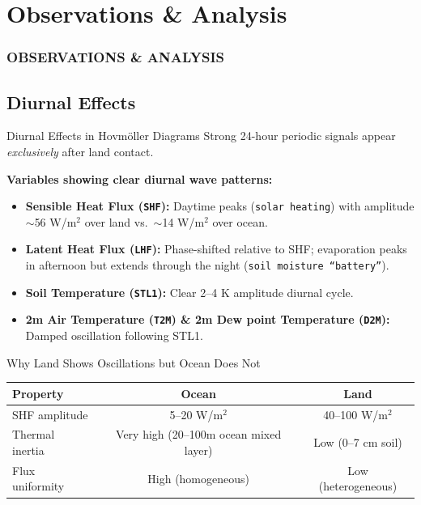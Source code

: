 \documentclass[10pt, aspectratio=169,t,xcolor=table]{beamer}
\begin{document}
\section{Observations \& Analysis}
\begin{frame}{}
	\frametitle{OBSERVATIONS \& ANALYSIS}
\end{frame}

\subsection{Diurnal Effects}
\begin{frame}{Diurnal Effects in Hovm\"oller Diagrams}
	Strong 24-hour periodic signals appear \textit{exclusively} after land contact.

	\vspace{0.2cm}
	\footnotesize
	\textbf{Variables showing clear diurnal wave patterns:}
	\begin{itemize}
		\item \textbf{Sensible Heat Flux (\texttt{SHF}):} Daytime peaks (\texttt{solar heating}) with amplitude $\sim$56 W/m$^2$ over land vs.\ $\sim$14 W/m$^2$ over ocean.
		\item \textbf{Latent Heat Flux (\texttt{LHF}):} Phase-shifted relative to SHF; evaporation peaks in afternoon but extends through the night (\texttt{soil moisture ``battery''}).
		\item \textbf{Soil Temperature (\texttt{STL1}):} Clear 2–4 K amplitude diurnal cycle.
		\item \textbf{2m Air Temperature (\texttt{T2M}) \& 2m Dew point Temperature (\texttt{D2M}):} Damped oscillation following STL1.
	\end{itemize}

	\vspace{0.2cm}
	\begin{block}{\small Why Land Shows Oscillations but Ocean Does Not}
		\footnotesize
		\begin{center}
			\begin{tabular}{lcc}
				\toprule
				\rowcolor{MyBlue!15}
				Property        & Ocean                                 & Land                \\
				\midrule
				SHF amplitude   & 5–20 W/m$^2$                          & 40–100 W/m$^2$      \\
				Thermal inertia & Very high (20–100m ocean mixed layer) & Low (0–7 cm soil)   \\
				Flux uniformity & High (homogeneous)                    & Low (heterogeneous) \\
				\bottomrule
			\end{tabular}
		\end{center}
	\end{block}


\end{frame}
\end{document}

